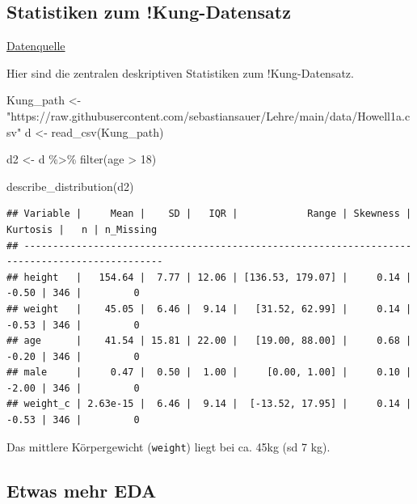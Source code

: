 \documentclass[
  a4paper,
  DIV=11]{scrreprt}
\newenvironment{Shaded}{\begin{snugshade}}{\end{snugshade}}
\newcommand{\DecValTok}[1]{\textcolor[rgb]{0.68,0.00,0.00}{#1}}
\newcommand{\FunctionTok}[1]{\textcolor[rgb]{0.28,0.35,0.67}{#1}}
\newcommand{\NormalTok}[1]{\textcolor[rgb]{0.00,0.23,0.31}{#1}}
\newcommand{\OtherTok}[1]{\textcolor[rgb]{0.00,0.23,0.31}{#1}}
\newcommand{\SpecialCharTok}[1]{\textcolor[rgb]{0.37,0.37,0.37}{#1}}
\newcommand{\StringTok}[1]{\textcolor[rgb]{0.13,0.47,0.30}{#1}}
\theoremstyle{definition}
\theoremstyle{remark}
\begin{document}
\hypertarget{statistiken-zum-kung-datensatz}{%
\subsection{Statistiken zum
!Kung-Datensatz}\label{statistiken-zum-kung-datensatz}}

\href{https://raw.githubusercontent.com/sebastiansauer/Lehre/main/data/Howell1a.csv}{Datenquelle}

Hier sind die zentralen deskriptiven Statistiken zum !Kung-Datensatz.

\begin{Shaded}
\begin{Highlighting}[]
\NormalTok{Kung\_path }\OtherTok{\textless{}{-}} \StringTok{"https://raw.githubusercontent.com/sebastiansauer/Lehre/main/data/Howell1a.csv"}  
\NormalTok{d }\OtherTok{\textless{}{-}} \FunctionTok{read\_csv}\NormalTok{(Kung\_path)  }

\NormalTok{d2 }\OtherTok{\textless{}{-}}\NormalTok{ d }\SpecialCharTok{\%\textgreater{}\%} \FunctionTok{filter}\NormalTok{(age }\SpecialCharTok{\textgreater{}} \DecValTok{18}\NormalTok{)}

\FunctionTok{describe\_distribution}\NormalTok{(d2)}
\end{Highlighting}
\end{Shaded}

\begin{verbatim}
## Variable |     Mean |    SD |   IQR |            Range | Skewness | Kurtosis |   n | n_Missing
## ----------------------------------------------------------------------------------------------
## height   |   154.64 |  7.77 | 12.06 | [136.53, 179.07] |     0.14 |    -0.50 | 346 |         0
## weight   |    45.05 |  6.46 |  9.14 |   [31.52, 62.99] |     0.14 |    -0.53 | 346 |         0
## age      |    41.54 | 15.81 | 22.00 |   [19.00, 88.00] |     0.68 |    -0.20 | 346 |         0
## male     |     0.47 |  0.50 |  1.00 |     [0.00, 1.00] |     0.10 |    -2.00 | 346 |         0
## weight_c | 2.63e-15 |  6.46 |  9.14 |  [-13.52, 17.95] |     0.14 |    -0.53 | 346 |         0
\end{verbatim}

Das mittlere Körpergewicht (\texttt{weight}) liegt bei ca. 45kg (sd 7
kg).

\hypertarget{etwas-mehr-eda}{%
\subsection{Etwas mehr EDA}\label{etwas-mehr-eda}}
\end{document}
